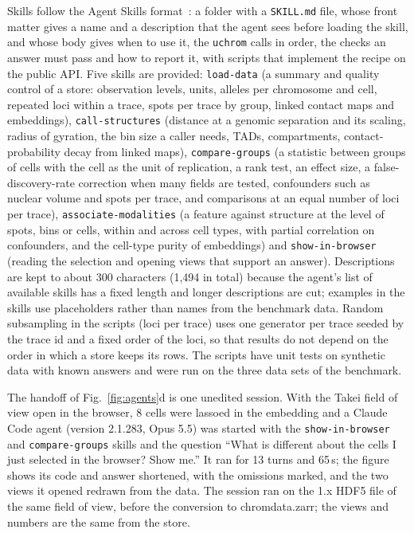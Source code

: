 \documentclass[11pt]{article}
\newcommand{\pkg}[1]{\texttt{#1}}
\begin{document}
Skills follow the Agent Skills format~\citep{agentskills}: a folder with a \pkg{SKILL.md} file, whose front matter gives a name and a description that the agent sees before loading the skill, and whose body gives when to use it, the \pkg{uchrom} calls in order, the checks an answer must pass and how to report it, with scripts that implement the recipe on the public API.
Five skills are provided: \pkg{load-data} (a summary and quality control of a store: observation levels, units, alleles per chromosome and cell, repeated loci within a trace, spots per trace by group, linked contact maps and embeddings), \pkg{call-structures} (distance at a genomic separation and its scaling, radius of gyration, the bin size a caller needs, TADs, compartments, contact-probability decay from linked maps), \pkg{compare-groups} (a statistic between groups of cells with the cell as the unit of replication, a rank test, an effect size, a false-discovery-rate correction when many fields are tested, confounders such as nuclear volume and spots per trace, and comparisons at an equal number of loci per trace), \pkg{associate-modalities} (a feature against structure at the level of spots, bins or cells, within and across cell types, with partial correlation on confounders, and the cell-type purity of embeddings) and \pkg{show-in-browser} (reading the selection and opening views that support an answer).
Descriptions are kept to about 300 characters (1,494 in total) because the agent's list of available skills has a fixed length and longer descriptions are cut; examples in the skills use placeholders rather than names from the benchmark data.
Random subsampling in the scripts (loci per trace) uses one generator per trace seeded by the trace id and a fixed order of the loci, so that results do not depend on the order in which a store keeps its rows.
The scripts have unit tests on synthetic data with known answers and were run on the three data sets of the benchmark.

The handoff of Fig.~\ref{fig:agents}d is one unedited session.
With the Takei field of view open in the browser, 8 cells were lassoed in the embedding and a Claude Code agent (version 2.1.283, Opus 5.5) was started with the \pkg{show-in-browser} and \pkg{compare-groups} skills and the question ``What is different about the cells I just selected in the browser? Show me.''
It ran for 13 turns and 65\,s; the figure shows its code and answer shortened, with the omissions marked, and the two views it opened redrawn from the data.
The session ran on the 1.x HDF5 file of the same field of view, before the conversion to chromdata.zarr; the views and numbers are the same from the store.
\end{document}
